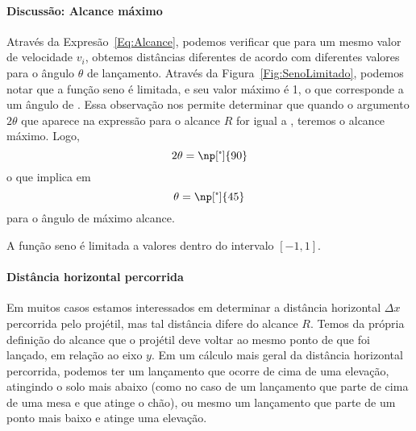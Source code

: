 \paragraph{Discussão: Alcance máximo}

Através da Expresão~\eqref{Eq:Alcance}, podemos verificar que para um mesmo valor de velocidade $v_i$, obtemos distâncias diferentes de acordo com diferentes valores para o ângulo $\theta$ de lançamento. Através da Figura~\ref{Fig:SenoLimitado}, podemos notar que a função seno é limitada, e seu valor máximo é 1, o que corresponde a um ângulo de . Essa observação nos permite determinar que quando o argumento $2\theta$ que aparece na expressão para o alcance $R$ for igual a , teremos o alcance máximo. Logo,
\begin{equation}
	2\theta = \np[\tcdegree]{90}
\end{equation}
%
o que implica em
\begin{equation}
	\theta = \np[\tcdegree]{45}
\end{equation}
%
para o ângulo de máximo alcance.

\begin{marginfigure}[-4cm]
\centering
{}
\caption{A função seno é limitada a valores dentro do intervalo $[-1,1]$.\label{Fig:SenoLimitado}}
\end{marginfigure}

\paragraph{Distância horizontal percorrida}

Em muitos casos estamos interessados em determinar a distância horizontal $\Delta x$ percorrida pelo projétil, mas tal distância difere do alcance $R$. Temos da própria definição do alcance que o projétil deve voltar ao mesmo ponto de que foi lançado, em relação ao eixo $y$. Em um cálculo mais geral da distância horizontal percorrida, podemos ter um lançamento que ocorre de cima de uma elevação, atingindo o solo mais abaixo (como no caso de um lançamento que parte de cima de uma mesa e que atinge o chão), ou mesmo um lançamento que parte de um ponto mais baixo e atinge uma elevação.

